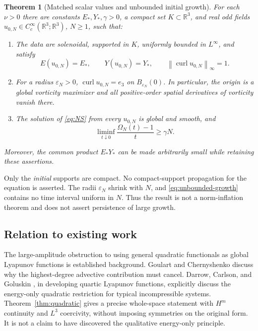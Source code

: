 \documentclass[11pt]{article}
\newtheorem{theorem}{Theorem}[section]
\theoremstyle{remark}
\newcommand{\R}{\mathbb R}
\newcommand{\curl}{\operatorname{curl}}
\newcommand{\norm}[1]{\left\lVert#1\right\rVert}
\begin{document}
\begin{theorem}[Matched scalar values and unbounded initial growth]
\label{thm:growth}
For each $\nu>0$ there are constants $E_*,Y_*,\gamma>0$, a compact set
$K\subset\R^3$, and real odd fields
$u_{0,N}\in C_c^\infty(\R^3;\R^3)$, $N\ge1$, such that:
\begin{enumerate}
\item The data are solenoidal, supported in $K$, uniformly bounded in
$L^\infty$, and satisfy
\begin{equation}
 E(u_{0,N})=E_*,\qquad Y(u_{0,N})=Y_*,\qquad
 \norm{\curl u_{0,N}}_\infty=1.\label{eq:matched}
\end{equation}
\item For a radius $\varepsilon_N>0$,
$\curl u_{0,N}=e_3$ on $B_{\varepsilon_N}(0)$. In particular, the origin is a
global vorticity maximizer and all positive-order spatial derivatives of
vorticity vanish there.
\item The solution of \eqref{eq:NS} from every $u_{0,N}$ is global and
smooth, and
\begin{equation}
 \liminf_{t\downarrow0}\frac{\Omega_N(t)-1}{t}\ge\gamma N.
 \label{eq:unbounded-growth}
\end{equation}
\end{enumerate}
Moreover, the common product $E_*Y_*$ can be made arbitrarily small while
retaining these assertions.
\end{theorem}

Only the \emph{initial} supports are compact. No compact-support propagation
for the equation is asserted. The radii $\varepsilon_N$ shrink with $N$,
and \eqref{eq:unbounded-growth} contains no time interval uniform in $N$.
Thus the result is not a norm-inflation theorem and does not assert
persistence of large growth.

\subsection{Relation to existing work}
The large-amplitude obstruction to using general quadratic functionals as
global Lyapunov functions is established background. Goulart and
Chernyshenko \cite{GC} discuss why the highest-degree advective contribution
must cancel. Darrow, Carlson, and Goluskin \cite{DCG}, in developing quartic
Lyapunov functions, explicitly discuss the energy-only quadratic restriction
for typical incompressible systems. Theorem~\ref{thm:quadratic} gives a
precise whole-space statement with $H^m$ continuity and $L^3$ coercivity,
without imposing symmetries on the original form. It is not a claim to have
discovered the qualitative energy-only principle.
\end{document}
